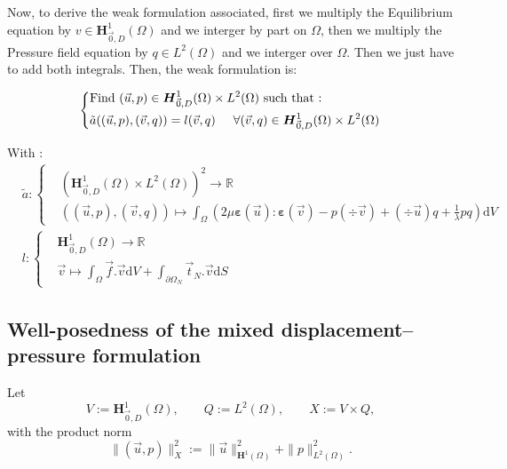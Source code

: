 \documentclass[a4paper,12pt,twoside]{report}
\newcommand{\mtr}{\mathbb{R}}
\newcommand{\dif}{\mathrm{d}}
\begin{document}
Now, to derive the weak formulation associated, first we multiply the Equilibrium equation by $v \in \boldsymbol H^1_{\vec 0,D}(\Omega)$ and we interger by part on $\Omega$, then we multiply the Pressure field equation by $q \in L^2(\Omega)$ and we interger over $\Omega$. Then we just have to add both integrals. 
Then, the weak formulation is: 
\begin{tcolorbox}
\begin{equation}
	\label{eq:weak_pressure_displ_form}
	\left\{
	\begin{aligned}
		&\text{Find } (\vec u,p) \in \boldsymbol H^1_{\vec 0,D}(\Omega) \times L^2(\Omega) \text{ such that :}\\
		& \tilde{a}((\vec u,p),(\vec v,q)) = l(\vec v,q) \hspace{0.5cm} \forall (\vec v,q) \in \boldsymbol H^1_{\vec 0,D}(\Omega) \times L^2(\Omega)
	\end{aligned}
	\right.
\end{equation}
\end{tcolorbox}

With : 
\begin{equation*}
	\begin{aligned}
		& \tilde{a} : \left\{
		\begin{aligned}
			&\left( \boldsymbol H^1_{\vec 0,D}(\Omega) \times L^2(\Omega) \right)^2 \rightarrow \mtr \\
			&((\vec u,p),(\vec v,q))  \longmapsto \int_\Omega \left( 2\mu \boldsymbol{\varepsilon}(\vec u) : \boldsymbol{\varepsilon}(\vec v) - p (\div \vec v) + (\div \vec u)q + \frac{1}{\lambda} pq \right) \dif V
		\end{aligned}
		\right. \\
		& l : 
		\left\{
		\begin{aligned}
			&\boldsymbol H^1_{\vec 0,D}(\Omega) \rightarrow \mtr \\
			&\vec v \longmapsto \int_\Omega \vec f . \vec v \dif V + \int_{\partial\Omega_N} \vec t_N.\vec v \dif S
		\end{aligned}
		\right.
	\end{aligned}
\end{equation*}


\subsection{Well-posedness of the mixed displacement–pressure formulation}

Let
\[
V:=\boldsymbol H^1_{\vec 0,D}(\Omega),\qquad Q:=L^2(\Omega),\qquad X:=V\times Q,
\]
with the product norm
\[
\|(\vec u,p)\|_X^2 := \|\vec u\|_{\boldsymbol H^1(\Omega)}^2 + \|p\|_{L^2(\Omega)}^2.
\]
\end{document}
